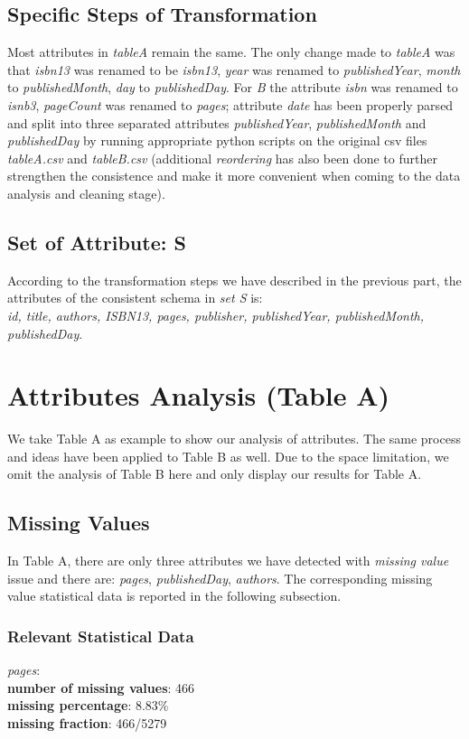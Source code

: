 \documentclass[10pt, oneside]{article}
\begin{document}
 \subsection*{Specific Steps of Transformation}
 Most attributes in \textit{tableA} remain the same. The only change made to \textit{tableA} was that \textit{isbn13} was renamed to be \textit{isbn13},
 \textit{year} was renamed to \textit{publishedYear},  \textit{month} to \textit{publishedMonth}, \textit{day} to \textit{publishedDay}. For \textit{B}
 the attribute \textit{isbn} was renamed to \textit{isnb3}, \textit{pageCount} was renamed to \textit{pages}; attribute \textit{date} has been properly 
 parsed and split into three separated attributes \textit{publishedYear}, \textit{publishedMonth} and \textit{publishedDay} by running appropriate python scripts on the original csv files \textit{tableA.csv} 
 and \textit{tableB.csv} (additional \textit{reordering} has also been done to further strengthen the consistence and make it more convenient when coming to the data analysis and cleaning stage).
 
 \subsection*{Set of Attribute: S}
 According to the transformation steps we have described in the previous part, the attributes of the consistent schema in \textit{set S} is: \\
\textit{ id, title, authors, ISBN13, pages, publisher,  publishedYear, publishedMonth, publishedDay}.


\section*{Attributes Analysis (Table A)}
We take Table A as example to show our analysis of attributes. The same process and ideas have been applied to Table B as well. Due to the space limitation, we omit the analysis of 
Table B here and only display our results for Table A. 
\subsection*{Missing Values}
In Table A, there are only three attributes we have detected with \textit{missing value} issue and there are: \textit{pages}, \textit{publishedDay}, \textit{authors}. The corresponding 
missing value statistical data is reported in the following subsection.

\subsubsection*{Relevant Statistical Data}
\textit{pages}:\\ 
\textbf{number of missing values}: 466\\ 
\textbf{missing percentage}: 8.83\%\\ 
\textbf{missing fraction}: 466/5279 
\end{document}
